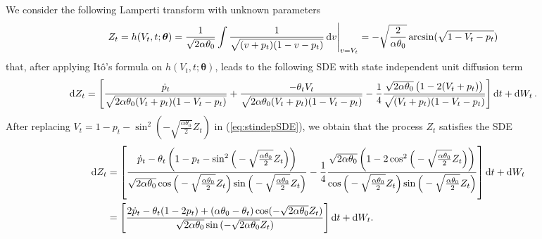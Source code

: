 \documentclass[11pt]{article}
\theoremstyle{definition}
\begin{document}
We consider the following Lamperti transform with unknown parameters
\begin{align}
Z_t = h(V_t, t; \bm{\theta} )  & = \frac{1}{\sqrt{2 \alpha \theta_0 }} \int \frac{1}{\sqrt{(v + p_t)(1 - v - p_t)}} \dif v \Bigg{\vert}_{v = V_t}   = - \sqrt{ \frac{2}{ \alpha \theta_0 }} \arcsin (\sqrt{ 1 - V_t - p_t}) \label{eq:LampZ}
\end{align}
that, after applying It\^{o}'s formula on $h(V_t, t; \bm{\theta} )$, leads to the following SDE with state independent unit diffusion term
\begin{align}
\dif Z_t = \Bigg[  & \frac{\dot{p}_t}{ \sqrt{2 \alpha \theta_0 (V_t + p_t)(1 - V_t - p_t)}}  + \frac{- \theta_t V_t}{ \sqrt{2  \alpha \theta_0 (V_t + p_t)(1 - V_t - p_t)}} - \frac{1}{4} \frac{\sqrt{2 \alpha \theta_0} \left( 1 - 2 (V_t + p_t)\right)}{\sqrt{(V_t + p_t)(1 - V_t - p_t)}}  \Bigg] \dif t + \dif W_t \,. \label{eq:stindepSDE}
\end{align}
After replacing $V_t = 1 - p_t - \sin^2 \left(- \sqrt{ \frac{ \alpha \theta_0}{2} } Z_t \right) $ in (\ref{eq:stindepSDE}), we obtain that the  process $Z_t$ satisfies the SDE
\begin{align}
\dif Z_t & = \left[ \frac{ \dot{p}_t  - \theta_t  \left(1 - p_t - \sin^2 \Big(- \sqrt{ \frac{ \alpha \theta_0}{2} } Z_t \Big) \right) }{\sqrt{2 \alpha \theta_0} \cos\Big(- \sqrt{ \frac{ \alpha \theta_0}{2} } Z_t \Big)  \sin\Big(- \sqrt{ \frac{ \alpha \theta_0}{2} } Z_t \Big)}   - \frac{1}{4}  \frac{\sqrt{2 \alpha \theta_0} \left(1 - 2 \cos^2 \Big(- \sqrt{ \frac{ \alpha \theta_0}{2} } Z_t \Big) \right) }{\cos\Big(- \sqrt{ \frac{ \alpha \theta_0}{2} } Z_t \Big)  \sin\Big(- \sqrt{ \frac{ \alpha \theta_0}{2} } Z_t \Big)} \right]\dif t + \dif W_t \nonumber \\
&  = \left[  \frac{  2  \dot{p}_t - \theta_t (1 - 2 p_t)  + (\alpha \theta_0 - \theta_t) \cos(- \sqrt{2 \alpha \theta_0 } Z_t) }{\sqrt{2 \alpha \theta_0} \sin{(- \sqrt{2 \alpha \theta_0} Z_t)}}  \right] \dif t + \dif W_t.  \label{eq:stindepSDE2}
\end{align}
\end{document}
